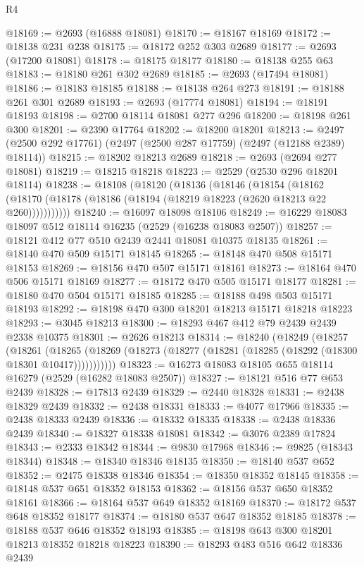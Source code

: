 \begin{lexlean}{R4}
\begin{coremodule}
@18169 := @2693 (@16888 @18081)
@18170 := @18167 @18169
@18172 := @18138 @231 @238
@18175 := @18172 @252 @303 @2689
@18177 := @2693 (@17200 @18081)
@18178 := @18175 @18177
@18180 := @18138 @255 @63
@18183 := @18180 @261 @302 @2689
@18185 := @2693 (@17494 @18081)
@18186 := @18183 @18185
@18188 := @18138 @264 @273
@18191 := @18188 @261 @301 @2689
@18193 := @2693 (@17774 @18081)
@18194 := @18191 @18193
@18198 := @2700 @18114 @18081 @277 @296
@18200 := @18198 @261 @300
@18201 := @2390 @17764
@18202 := @18200 @18201
@18213 := @2497 (@2500 @292 @17761) (@2497 (@2500 @287 @17759) (@2497 (@12188 @2389) @18114))
@18215 := @18202 @18213 @2689
@18218 := @2693 (@2694 @277 @18081)
@18219 := @18215 @18218
@18223 := @2529 (@2530 @296 @18201 @18114)
@18238 := @18108
    (@18120
      (@18136
        (@18146
          (@18154
            (@18162 (@18170 (@18178 (@18186 (@18194 (@18219 @18223 (@2620 @18213 @22 @260)))))))))))
@18240 := @16097 @18098 @18106
@18249 := @16229 @18083 @18097 @512 @18114 @16235 (@2529 (@16238 @18083 @2507))
@18257 := @18121 @412 @77 @510 @2439 @2441 @18081 @10375 @18135
@18261 := @18140 @470 @509 @15171 @18145
@18265 := @18148 @470 @508 @15171 @18153
@18269 := @18156 @470 @507 @15171 @18161
@18273 := @18164 @470 @506 @15171 @18169
@18277 := @18172 @470 @505 @15171 @18177
@18281 := @18180 @470 @504 @15171 @18185
@18285 := @18188 @498 @503 @15171 @18193
@18292 := @18198 @470 @300 @18201 @18213 @15171 @18218 @18223
@18293 := @3045 @18213
@18300 := @18293 @467 @412 @79 @2439 @2439 @2338 @10375
@18301 := @2626 @18213
@18314 := @18240
    (@18249
      (@18257
        (@18261
          (@18265 (@18269 (@18273 (@18277 (@18281 (@18285 (@18292 (@18300 @18301 @10417)))))))))))
@18323 := @16273 @18083 @18105 @655 @18114 @16279 (@2529 (@16282 @18083 @2507))
@18327 := @18121 @516 @77 @653 @2439
@18328 := @17813 @2439
@18329 := @2440 @18328
@18331 := @2438 @18329 @2439
@18332 := @2438 @18331
@18333 := @4077 @17966
@18335 := @2438 @18333 @2439
@18336 := @18332 @18335
@18338 := @2438 @18336 @2439
@18340 := @18327 @18338 @18081
@18342 := @3076 @2389 @17824
@18343 := @2333 @18342
@18344 := @9830 @17968
@18346 := @9825 (@18343 @18344)
@18348 := @18340 @18346 @18135
@18350 := @18140 @537 @652
@18352 := @2475 @18338 @18346
@18354 := @18350 @18352 @18145
@18358 := @18148 @537 @651 @18352 @18153
@18362 := @18156 @537 @650 @18352 @18161
@18366 := @18164 @537 @649 @18352 @18169
@18370 := @18172 @537 @648 @18352 @18177
@18374 := @18180 @537 @647 @18352 @18185
@18378 := @18188 @537 @646 @18352 @18193
@18385 := @18198 @643 @300 @18201 @18213 @18352 @18218 @18223
@18390 := @18293 @483 @516 @642 @18336 @2439

\end{coremodule}
\end{lexlean}
